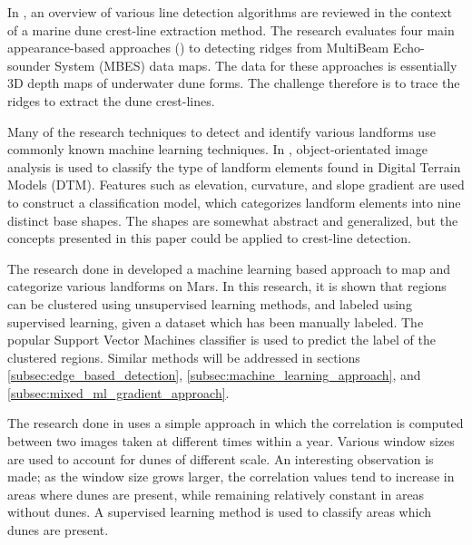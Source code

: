 In \cite{2016_comparisons_crest_line_extraction_marine_dunes}, an overview of various line detection algorithms are reviewed in the context of a marine dune crest-line extraction method. The research evaluates four main appearance-based approaches (\cite{2005_topology_driven_algorithms_for_ridge_extraction,2005_smooth_feature_lines_surface_meshes,2004_ridge_valley_lines_meshes_surface_fitting}) to detecting ridges from MultiBeam Echo-sounder System (MBES) data maps. The data for these approaches is essentially 3D depth maps of underwater dune forms. The challenge therefore is to trace the ridges to extract the dune crest-lines.

Many of the research techniques to detect and identify various landforms use commonly known machine learning techniques. In \cite{2006_automated_classification_landform_elements}, object-orientated image analysis is used to classify the type of landform elements found in Digital Terrain Models (DTM). Features such as elevation, curvature, and slope gradient are used to construct a classification model, which categorizes landform elements into nine distinct base shapes. The shapes are somewhat abstract and generalized, but the concepts presented in this paper could be applied to crest-line detection.

The research done in \cite{2007_Machine_Learning_tools_automatic_mapping_mars} developed a machine learning based approach to map and categorize various landforms on Mars. In this research, it is shown that regions can be clustered using unsupervised learning methods, and labeled using supervised learning, given a dataset which has been manually labeled. The popular Support Vector Machines classifier is used to predict the label of the clustered regions. Similar methods will be addressed in sections \ref{subsec:edge_based_detection}, \ref{subsec:machine_learning_approach}, and \ref{subsec:mixed_ml_gradient_approach}.

The research done in \cite{2013_sar_image_automated_detection_dune_area} uses a simple approach in which the correlation is computed between two images taken at different times within a year. Various window sizes are used to account for dunes of different scale. An interesting observation is made; as the window size grows larger, the correlation values tend to increase in areas where dunes are present, while remaining relatively constant in areas without dunes. A supervised learning method is used to classify areas which dunes are present.

